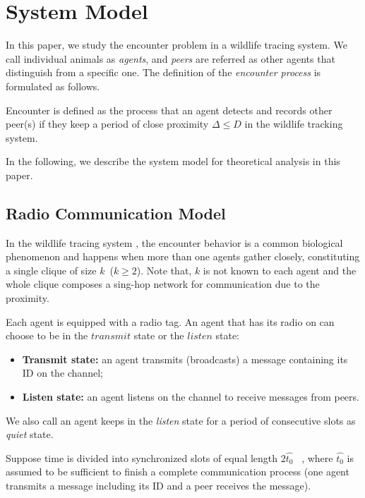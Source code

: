 \section{System Model}
\label{sectionmodel}

In this paper, we study the encounter problem in a wildlife 
tracing system. We call individual animals as \emph{agents}, 
and \emph{peers} are referred as other agents that distinguish from 
a specific one.
The definition of the \emph{encounter process} is formulated as follows.
\begin{definition}
Encounter is defined as the process that 
an agent detects and records other peer(s) if they keep a period of 
close proximity $\Delta \leq D$
in the wildlife tracking system. 
\end{definition}

In the following, we describe the system model for theoretical analysis in this paper.



\subsection{Radio Communication Model}


In the  wildlife tracing system {\sysname}, the encounter behavior  
is a common biological phenomenon and
happens when more than one agents gather closely, constituting a 
single clique of size $k$~($k \geq 2$).
Note that, $k$ is not known to each agent and the whole 
clique composes a sing-hop network for communication due to the proximity. 

Each agent is equipped with a radio tag. 
An agent that has its radio on can choose to be in the $transmit$ state
or the $listen$ state:
\begin{itemize}
\item \textbf{Transmit state:} an agent transmits (broadcasts) 
a message containing its ID on the channel;
\item  \textbf{Listen state:} an agent listens on 
the channel to receive messages from peers.
\end{itemize}
We also call an agent keeps in the \emph{listen} state for a period of consecutive slots 
as \emph{quiet} state.

Suppose time is divided into synchronized slots of equal 
length $2\hat{t_0}$~\cite{Xu2005Lightweight, Sivrikaya2004Time}
, where $\hat{t_0}$ is assumed to be sufficient to finish a complete
communication process (one agent transmits a message including its ID and
a peer receives the message).

